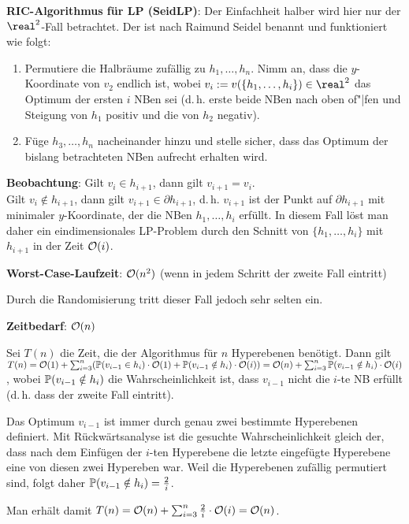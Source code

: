 \textbf{RIC-Algorithmus für LP (SeidLP)}:
Der Einfachheit halber wird hier nur der $\real^2$-Fall betrachtet.
Der  ist nach Raimund Seidel benannt und funktioniert wie folgt:
\begin{enumerate}
    \item
    Permutiere die Halbräume zufällig zu $h_1, \dotsc, h_n$.
    Nimm an, dass die $y$-Koordinate von $v_2$ endlich ist,
    wobei $v_i := v(\{h_1, \dotsc, h_i\}) \in \real^2$ das Optimum der ersten $i$ NBen sei
    (d.\,h. erste beide NBen nach oben of"|fen und Steigung von $h_1$ positiv und die von
    $h_2$ negativ).

    \item
    Füge $h_3, \dotsc, h_n$ nacheinander hinzu und stelle sicher, dass das Optimum der bislang
    betrachteten NBen aufrecht erhalten wird.
\end{enumerate}

\textbf{Beobachtung}:
Gilt $v_i \in h_{i+1}$, dann gilt $v_{i+1} = v_i$.\\
Gilt $v_i \notin h_{i+1}$, dann gilt $v_{i+1} \in \partial h_{i+1}$,
d.\,h. $v_{i+1}$ ist der Punkt auf $\partial h_{i+1}$ mit minimaler $y$-Koordinate,
der die NBen $h_1, \dotsc, h_i$ erfüllt.
In diesem Fall löst man daher ein eindimensionales LP-Problem durch den Schnitt von
$\{h_1, \dotsc, h_i\}$ mit $h_{i+1}$ in der Zeit $\mathcal{O}(i)$.

\linie

\textbf{Worst-Case-Laufzeit}:
$\mathcal{O}(n^2)$
(wenn in jedem Schritt der zweite Fall eintritt)

Durch die Randomisierung tritt dieser Fall jedoch sehr selten ein.

\textbf{Zeitbedarf}:
$\mathcal{O}(n)$

\begin{Beweis}
    Sei $T(n)$ die Zeit, die der Algorithmus für $n$ Hyperebenen benötigt.
    Dann gilt\\
    $T(n) = \mathcal{O}(1) +
    \sum_{i=3}^n (\mathbb{P}(v_{i-1} \in h_i) \cdot \mathcal{O}(1) + \mathbb{P}(v_{i-1} \notin h_i) \cdot \mathcal{O}(i))
    = \mathcal{O}(n) + \sum_{i=3}^n \mathbb{P}(v_{i-1} \notin h_i) \cdot \mathcal{O}(i)$,
    wobei $\mathbb{P}(v_{i-1} \notin h_i)$ die Wahrscheinlichkeit ist, dass $v_{i-1}$ nicht die
    $i$-te NB erfüllt (d.\,h. dass der zweite Fall eintritt).

    Das Optimum $v_{i-1}$ ist immer durch genau zwei bestimmte Hyperebenen definiert.
    Mit Rückwärtsanalyse ist die gesuchte Wahrscheinlichkeit gleich der, dass
    nach dem Einfügen der $i$-ten Hyperebene die letzte eingefügte Hyperebene eine von diesen
    zwei Hypereben war.
    Weil die Hyperebenen zufällig permutiert sind, folgt daher
    $\mathbb{P}(v_{i-1} \notin h_i) = \frac{2}{i}$.

    Man erhält damit $T(n) = \mathcal{O}(n) + \sum_{i=3}^n \frac{2}{i} \cdot \mathcal{O}(i) = \mathcal{O}(n)$.
\end{Beweis}

